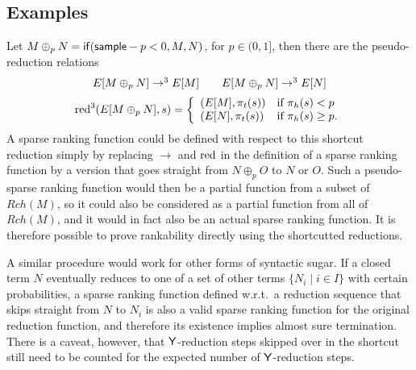 \subsection{Examples}
Let $M \oplus_p N = \mathsf{if}(\mathsf{sample} - p < 0, M, N)$, for $p \in (0,1]$, then there are the pseudo-reduction relations
\[
\begin{array}{c}
E[M \oplus_p N] \to^3  E[M] \qquad
E[M \oplus_p N] \to^3  E[N] \\[2mm]
\operatorname{red}^3(E[M \oplus_p N], s) = \left\{
    \begin{array}{ll}
        (E[M],\pi_t(s)) & \text{if } \pi_h(s) < p \\
        (E[N],\pi_t(s)) & \text{if } \pi_h(s) \geq p. 
    \end{array} \right .
\end{array}
\]
A sparse ranking function could be defined with respect to this shortcut reduction simply by replacing $\to$ and $\operatorname{red}$ in the definition of a sparse ranking function by a version that goes straight from $N \oplus_p O$ to $N$ or $O$. 
Such a pseudo-sparse ranking function would then be a partial function from a subset of $Rch(M)$, so it could also be considered as a partial function from all of $Rch(M)$, and it would in fact also be an actual sparse ranking function. 
It is therefore possible to prove rankability directly using the shortcutted reductions.

A similar procedure would work for other forms of syntactic sugar. 
If a closed term $N$ eventually reduces to one of a set of other terms $\{N_i \mid i \in I\}$ with certain probabilities, a sparse ranking function defined w.r.t.~a reduction sequence that skips straight from $N$ to $N_i$ is also a valid sparse ranking function for the original reduction function, and therefore its existence implies almost sure termination. 
There is a caveat, however, that $\mathsf{Y}$-reduction steps skipped over in the shortcut still need to be counted for the expected number of $\mathsf{Y}$-reduction steps.

